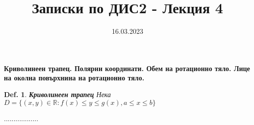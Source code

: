 \documentclass[12pt]{article}
\newtheorem{definition}{Def.}
\begin{document}
	\color{white}
	\pagecolor{darkgray}
	\title{Записки по ДИС2 - Лекция 4}
	\date{16.03.2023}
	\maketitle
	\begin{center}
		\Large
		\textbf{Криволинеен трапец. Полярни координати. Обем на ротационно тяло. Лице на околна повърхнина на ротационно тяло.}
	\end{center}

	\begin{definition} \textbf{\textit{Криволинеен трапец}}
		Нека $D = \{(x,y)\in \mathbb{R}: f(x)\leq y\leq g(x), a \leq x \leq b\}$
	\end{definition}
	..................
	
\end{document}
